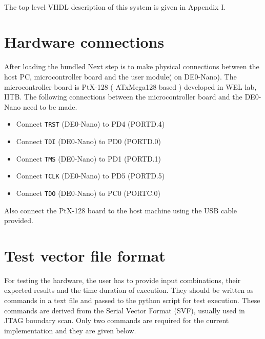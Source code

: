 \documentclass[a4paper,11pt]{article}
\begin{document}
\paragraph*{}
The top level VHDL description of this system is given in Appendix I.


\section{Hardware connections}
After loading the bundled Next step is to make physical connections between the host PC, microcontroller board and the user module( on DE0-Nano). The microcontroller board is PtX-128 ( ATxMega128 based ) developed in WEL lab, IITB. The following connections between the microcontroller board and the DE0-Nano need to be made.

\begin{itemize}
\item Connect \texttt{TRST} (DE0-Nano) to PD4 (PORTD.4)
\item Connect \texttt{TDI} (DE0-Nano) to PD0 (PORTD.0)
\item Connect \texttt{TMS} (DE0-Nano) to PD1 (PORTD.1)
\item Connect \texttt{TCLK} (DE0-Nano) to PD5 (PORTD.5)
\item Connect \texttt{TDO} (DE0-Nano) to PC0 (PORTC.0)
\end{itemize}

Also connect the PtX-128 board to the host machine using the USB cable provided.

\section{Test vector file format}
For testing the hardware, the user has to provide input combinations, their expected results and the time duration of execution. They should be written as commands in a text file and passed to the python script for test execution. These commands are derived from the Serial Vector Format (SVF)\cite{svf}, usually used in JTAG boundary scan. Only two commands are required for the current implementation and they are given below.
\end{document}
